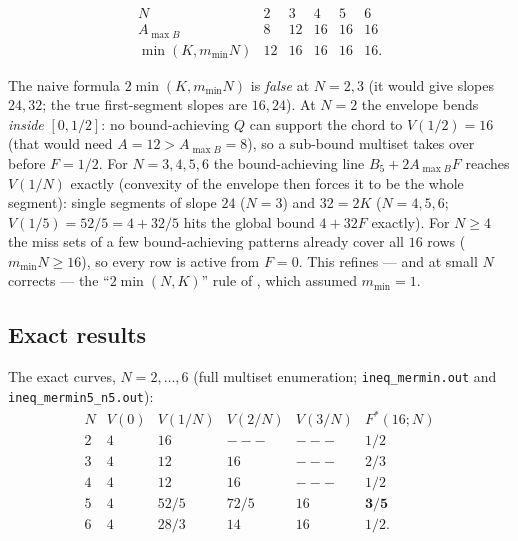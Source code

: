\documentclass[aps,pra,reprint,superscriptaddress,floatfix]{revtex4-2}
\begin{document}
\begin{equation*}
\begin{array}{c|ccccc}
N & 2 & 3 & 4 & 5 & 6\\
\hline
A_{\max B} & 8 & 12 & 16 & 16 & 16\\
\min(K,m_{\min}N) & 12 & 16 & 16 & 16 & 16.
\end{array}
\end{equation*}

The naive formula $2\min(K,m_{\min}N)$ is \emph{false} at $N=2,3$ (it
would give slopes $24,32$; the true first-segment slopes are $16,24$). At
$N=2$ the envelope bends \emph{inside} $[0,1/2]$: no bound-achieving $Q$
can support the chord to $V(1/2)=16$ (that would need $A=12>
A_{\max B}=8$), so a sub-bound multiset takes over before $F=1/2$. For
$N=3,4,5,6$ the bound-achieving line $B_{5}+2A_{\max B}F$ reaches
$V(1/N)$ exactly (convexity of the envelope then forces it to be the whole
segment): single segments of slope $24$ ($N=3$) and $32=2K$ ($N=4,5,6$;
$V(1/5)=52/5=4+32/5$ hits the global bound $4+32F$ exactly). For $N\ge 4$
the miss sets of a few bound-achieving patterns already cover all $16$
rows ($m_{\min}N\ge 16$), so every row is active from $F=0$. This refines
--- and at small $N$ corrects --- the ``$2\min(N,K)$'' rule of
\cite{mainpaper2026}, which assumed $m_{\min}=1$.

\subsection{Exact results}

The exact curves, $N=2,\dots,6$ (full multiset enumeration;
\texttt{ineq\_mermin.out} and \texttt{ineq\_mermin5\_n5.out}):
\begin{equation*}
\begin{array}{c|ccccc}
N & V(0) & V(1/N) & V(2/N) & V(3/N) & F^{*}(16;N)\\
\hline
2 & 4 & 16 & --- & --- & 1/2\\
3 & 4 & 12 & 16 & --- & 2/3\\
4 & 4 & 12 & 16 & --- & 1/2\\
5 & 4 & 52/5 & 72/5 & 16 & \mathbf{3/5}\\
6 & 4 & 28/3 & 14 & 16 & 1/2.
\end{array}
\end{equation*}
\end{document}
